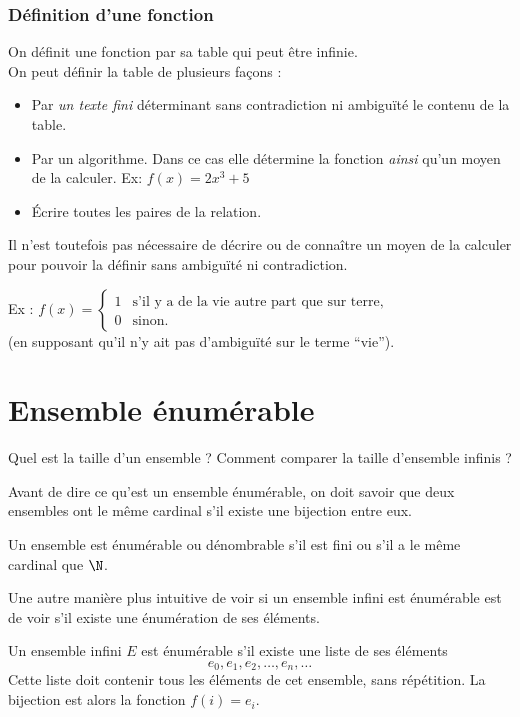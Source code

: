 \subsubsection{Définition d'une fonction}
\label{par:d_finition_d_une_fonciton}
On définit une fonction par sa table qui peut être infinie.\\
On peut définir la table de plusieurs façons :
\begin{itemize}
	\item Par \emph{un texte fini} déterminant sans contradiction ni ambiguïté le contenu 
		de la table.
	\item Par un algorithme. Dans ce cas elle détermine la fonction \textit{ainsi} qu'un moyen de la calculer.
		\subitem Ex: $f(x) = 2x^3+5$
	\item Écrire toutes les paires de la relation.
\end{itemize}
Il n'est toutefois pas nécessaire de décrire ou de connaître un moyen de la calculer
pour pouvoir la définir sans ambiguïté ni contradiction. 

Ex : $f(x) = \left\{\begin{array}{ll} 1 & \text{s'il y a de la vie autre part que sur terre,} \\ 0 & \text{sinon.}\end{array}\right.$\\(en supposant qu'il n'y ait pas d'ambiguïté sur le terme ``vie'').\\

\section{Ensemble énumérable}
\label{sec:ensemble_num_rables}
Quel est la taille d'un ensemble ?  Comment comparer la taille d'ensemble infinis ?

Avant de dire ce qu'est un ensemble énumérable, on doit savoir que deux ensembles
ont le même cardinal s'il existe une bijection entre eux.

\begin{mydef}
	Un ensemble est énumérable ou dénombrable s'il est fini ou s'il a le même cardinal que $\N$.
\end{mydef}
Une autre manière plus intuitive de voir si un ensemble infini est énumérable est de voir s'il existe une énumération de ses éléments.

\begin{myprop} 
Un ensemble infini $E$ est énumérable s'il existe une liste de ses éléments  
\[
e_0, e_1, e_2, \ldots , e_n, \ldots
\]
Cette liste doit contenir tous les éléments de cet ensemble, sans répétition.  La bijection est alors la fonction $f(i) = e_i$.  
\end{myprop}


